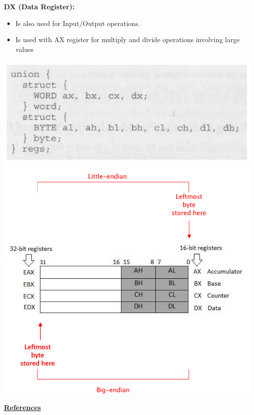 \documentclass[12pt]{article}
\begin{document}
\begin{enumerate}[1.]
\begin{itemize}
\begin{itemize}
\begin{itemize}
                \textbf{DX (Data Register):}
                \begin{itemize}
                    \item Is also used for Input/Output operations.
                    \item Is used with AX register for multiply and divide operations
                    involving large values
                \end{itemize}


                \bigskip

                \begin{center}
                \includegraphics[width=0.8\linewidth]{images/review_9_solution_13.png}
                \includegraphics[width=0.8\linewidth]{images/review_9_solution_14.png}
                \end{center}
            \end{itemize}
        \end{itemize}
    \end{itemize}

    \bigskip

    \underline{\textbf{References}}


\end{enumerate}
\end{document}
